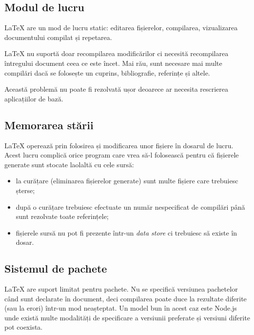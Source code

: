 \documentclass[a4wide,12pt]{report}
\newcommand{\eng}[1]{\emph{#1}} %
\begin{document}
\subsection{Modul de lucru}

\LaTeX{} are un mod de lucru static: editarea fișierelor, compilarea,
vizualizarea documentului compilat și repetarea.

\LaTeX{} nu suportă doar recompilarea modificărilor ci necesită recompilarea
întregului document ceea ce este încet. Mai rău, sunt necesare mai multe
compilări dacă se folosește un cuprins, bibliografie, referințe și altele.

Această problemă nu poate fi rezolvată ușor deoarece ar necesita rescrierea
aplicațiilor de bază.

\subsection{Memorarea stării}
\label{memstasub}

\LaTeX{} operează prin folosirea și modificarea unor fișiere în dosarul de
lucru. Acest lucru complică orice program care vrea să-l folosească pentru că
fișierele generate sunt stocate laolaltă cu cele sursă:

\begin{itemize}

\item la curățare (eliminarea fișierelor generate) sunt multe fișiere care
trebuiesc șterse;

\item după o curățare trebuiesc efectuate un număr nespecificat de compilări
până sunt rezolvate toate referințele;

\item fișierele sursă nu pot fi prezente într-un \eng{data store} ci trebuiesc
să existe în dosar.

\end{itemize}

\subsection{Sistemul de pachete}

\LaTeX{} are suport limitat pentru pachete. Nu se specifică versiunea pachetelor
când sunt declarate în document, deci compilarea poate duce la rezultate
diferite (sau la erori) într-un mod neașteptat. Un model bun în acest caz
este Node.js unde există multe modalități de specificare a versiunii preferate
și versiuni diferite pot coexista.
\end{document}
